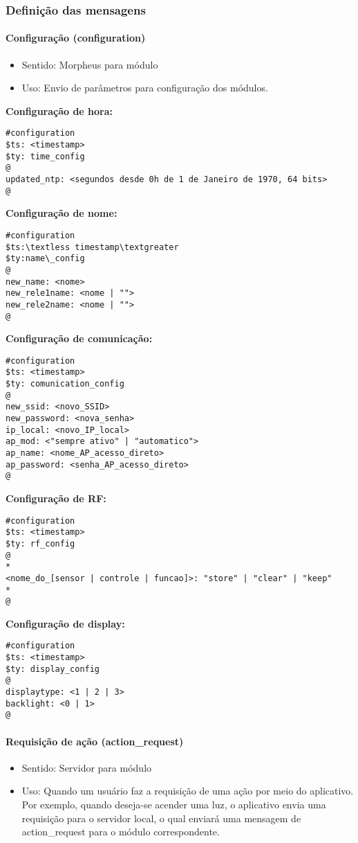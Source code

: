 \subsubsection{Definição das mensagens}
\paragraph{Configuração (configuration)}
\begin{itemize}
\item Sentido: Morpheus para módulo
\item Uso: Envio de parâmetros para configuração dos módulos.
\end{itemize}

\textbf{Configuração de hora:}
\begin{lstlisting}
#configuration
$ts: <timestamp>
$ty: time_config
@
updated_ntp: <segundos desde 0h de 1 de Janeiro de 1970, 64 bits>
@
\end{lstlisting}

\textbf{Configuração de nome:}
\begin{lstlisting}
#configuration
$ts:\textless timestamp\textgreater
$ty:name\_config
@
new_name: <nome>
new_rele1name: <nome | "">
new_rele2name: <nome | "">
@
\end{lstlisting}

\textbf{Configuração de comunicação:}
\begin{lstlisting}
#configuration
$ts: <timestamp>
$ty: comunication_config
@
new_ssid: <novo_SSID>
new_password: <nova_senha>
ip_local: <novo_IP_local>
ap_mod: <"sempre ativo" | "automatico">
ap_name: <nome_AP_acesso_direto>
ap_password: <senha_AP_acesso_direto>
@
\end{lstlisting}

\textbf{Configuração de RF:}
\begin{lstlisting}
#configuration
$ts: <timestamp>
$ty: rf_config
@
*
<nome_do_[sensor | controle | funcao]>: "store" | "clear" | "keep"
*
@
\end{lstlisting}

\textbf{Configuração de display:}
\begin{lstlisting}
#configuration
$ts: <timestamp>
$ty: display_config
@
displaytype: <1 | 2 | 3>
backlight: <0 | 1>
@
\end{lstlisting}

\paragraph{Requisição de ação (action\_request)}
\begin{itemize}
\item Sentido: Servidor para módulo
\item Uso: Quando um usuário faz a requisição de uma ação por meio do aplicativo. Por exemplo, quando deseja-se acender uma luz, o aplicativo envia uma requisição para o servidor local, o qual enviará uma mensagem de action\_request para o módulo correspondente.
\end{itemize}

